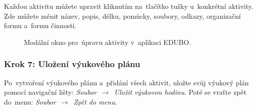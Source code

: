 \documentclass[male,czech,api_bc]{kitheses}
\begin{document}
Každou aktivitu můžete upravit kliknutím na~tlačítko tužky u~konkrétní aktivity. Zde můžete měnit název, popis, délku, pomůcky, soubory, odkazy, organizační formu a~formu činnosti.

\begin{figure}[H]
	\centering
	\caption{Modální okno pro~úpravu aktivity v~aplikaci EDUBO.}
	\label{fig:manual-2}
\end{figure}

\subsubsection{Krok 7: Uložení výukového plánu}
Po~vytvoření výukového plánu a~přidání všech aktivit, uložte svůj výukový plán pomocí navigační lišty: \textit{Soubor}~$\rightarrow$~\textit{Uložit výukovou hodinu}. Poté se vraťte zpět do~menu: \textit{Soubor}~$\rightarrow$~\textit{Zpět do menu}.
\end{document}
